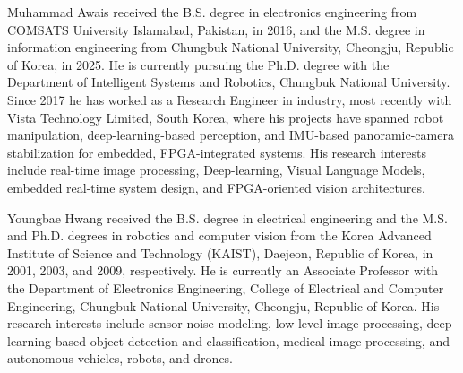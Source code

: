 \documentclass[journal]{IEEEtran}
\begin{document}
\begin{IEEEbiographynophoto}{Muhammad Awais}
received the B.S. degree in electronics engineering from COMSATS University Islamabad, Pakistan, in 2016, and the M.S. degree in information engineering from Chungbuk National University, Cheongju, Republic of Korea, in 2025. He is currently pursuing the Ph.D. degree with the Department of Intelligent Systems and Robotics, Chungbuk National University. Since 2017 he has worked as a Research Engineer in industry, most recently with Vista Technology Limited, South Korea, where his projects have spanned robot manipulation, deep-learning-based perception,  and IMU-based panoramic-camera stabilization for embedded, FPGA-integrated systems. His research interests include real-time image processing, Deep-learning, Visual Language Models,  embedded real-time system design, and FPGA-oriented vision architectures.
\end{IEEEbiographynophoto}

\begin{IEEEbiographynophoto}{Youngbae Hwang}
received the B.S. degree in electrical engineering and the M.S. and Ph.D. degrees in robotics and computer vision from the Korea Advanced Institute of Science and Technology (KAIST), Daejeon, Republic of Korea, in 2001, 2003, and 2009, respectively. He is currently an Associate Professor with the Department of Electronics Engineering, College of Electrical and Computer Engineering, Chungbuk National University, Cheongju, Republic of Korea. His research interests include sensor noise modeling, low-level image processing, deep-learning-based object detection and classification, medical image processing, and autonomous vehicles, robots, and drones.
\end{IEEEbiographynophoto}
\end{document}

